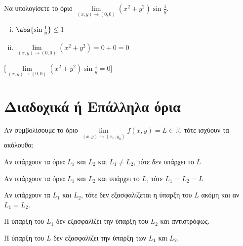 \begin{example}
  Να υπολογίσετε το όριο $ \lim\limits_{(x,y)\to (0, 0)} (x^{2}+y^{2}) 
  \sin{\frac{1}{y}} $.  

  \begin{solution}
  \item {}
    \begin{minipage}{0.34\textwidth}
      \begin{enumerate}[i)]
        \item $ \abs{\sin{\frac{1}{y}}} \leq 1 $ \hfill {}
        \item $ \lim\limits_{(x,y)\to (0, 0)} (x^{2}+y^{2}) = 0+0=0 $ 
          \hfill {}
      \end{enumerate}
    \end{minipage}
    [$ \lim\limits_{(x,y)\to (0, 0)} (x^{2}+y^{2}) \sin{\frac{1}{y}} 
    = 0$]
  \end{solution}
\end{example}


\section{Διαδοχικά ή Επάλληλα όρια}


\begin{rem}
  Αν συμβολίσουμε το όριο 
  $ \lim\limits_{(x,y)\to (x_{0}, y_{0})} f(x,y) = L \in \mathbb{R} $, τότε 
  ισχύουν τα ακόλουθα:
  \begin{myitemize}
    \item Αν υπάρχουν τα όρια $ L_{1} $ και $ L_{2} $ και $ L_{1} \neq L_{2} $, τότε
      δεν υπάρχει το $ L $
    \item Αν υπάρχουν τα όρια $ L_{1} $ και $ L_{2} $ και υπάρχει το $ L $, τότε
      $ L_{1}=L_{2}=L $
    \item Αν υπάρχουν τα $ L_{1} $ και $ L_{2} $, τότε δεν εξασφαλίζεται η ύπαρξη του 
      $ L $ ακόμη και αν $ L_{1}=L_{2} $.
    \item Η ύπαρξη του $ L_{1} $ δεν εξασφαλίζει την ύπαρξη του $ L_{2} $ και αντιστρόφως.
    \item Η ύπαρξη του $ L $ δεν εξασφαλίζει την ύπαρξη των $ L_{1} $ και $ L_{2} $.
  \end{myitemize}
\end{rem}

